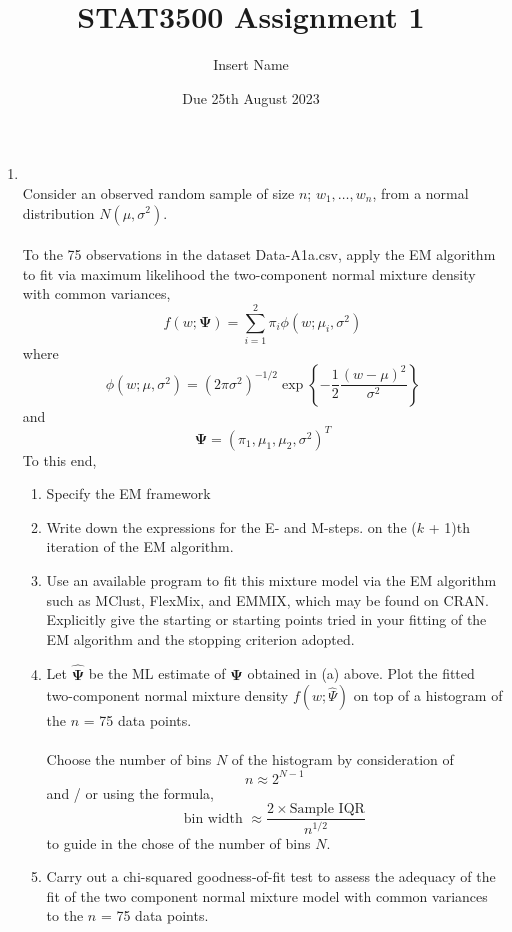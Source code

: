 \documentclass[10pt]{article}
\title{STAT3500 Assignment 1}
\author{{Insert Name}}
\date{Due 25th August 2023}
\newcommand{\ds}{\displaystyle}
\renewcommand{\hat}{\widehat}
\newcommand{\bs}{\boldsymbol}
\begin{document}
\maketitle

\begin{enumerate}[label=\textbf{\alph*)}]
    \item \text{[15 marks]}\\
    Consider an observed random sample of size $n$; $w_1, \dots, w_n$, from a normal distribution $N(\mu, \sigma^2)$. \\
    \\
    To the 75 observations in the dataset Data-A1a.csv, apply the EM algorithm to fit via maximum likelihood the two-component normal mixture density with common variances,
    \[ f(w; \bs \Psi) = \ds \sum_{i=1}^2 \pi_i \phi(w; \mu_i, \sigma^2)\]
    where 
    \[ \phi(w; \mu, \sigma^2) = (2\pi \sigma^2)^{-1/2} \exp \left\{-\frac{1}{2}\dfrac{(w - \mu)^2}{\sigma^2} \right\}\]
    and 
    \[ \bs \Psi = (\pi_1, \mu_1, \mu_2, \sigma^2)^T\]
    To this end,
    \begin{enumerate}[label=\textbf{(\roman*)}]
        \item \text{[1/2 marks]} Specify the EM framework\\
        \item \text{[1/2 marks]} Write down the expressions for the E- and M-steps. on the ($k$ + 1)th iteration of the EM algorithm.\\
        \item \text{[3 marks]} Use an available program to fit this mixture model via the EM algorithm such as MClust, FlexMix, and EMMIX, which may be found on CRAN. Explicitly give the starting or starting points tried in your fitting of the EM algorithm and the stopping criterion adopted.\\
        \item \text{[3 marks]} Let $\hat{\bs \Psi}$ be the ML estimate of $\bs \Psi$ obtained in (a) above. Plot the fitted two-component normal mixture density $f(w; \hat{\Psi})$ on top of a histogram of the $n$ = 75 data points.\\
        \\
        Choose the number of bins $N$ of the histogram by consideration of 
        \[ n \approx 2^{N-1}\]
        and / or using the formula,
        \[ \text{bin width } \approx \dfrac{2 \times \text{Sample IQR}}{n^{1/2}}\]
        to guide in the chose of the number of bins $N$.\\
        \item \text{[2 marks]} Carry out a chi-squared goodness-of-fit test to assess the adequacy of the fit of the two component normal mixture model with common variances to the $n$ = 75 data points.\\

\end{enumerate}
\end{enumerate}
\end{document}
